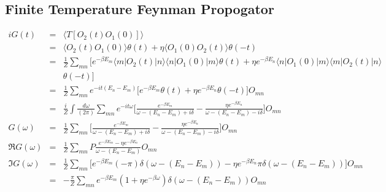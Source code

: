 \documentclass[12pt]{book}
\begin{document}
	\subsection{Finite Temperature Feynman Propogator}
	\begin{eqnarray}
		iG(t)&=&\langle T[O_2(t)O_1(0)]\rangle\\
		&=&\langle O_2(t)O_1(0)\rangle\theta(t)+\eta\langle O_1(0)O_2(t)\rangle\theta(-t)\\
		&=&\frac 1Z\sum_{mn}\big[e^{-\beta E_m}\langle m|O_2(t)|n\rangle\langle n|O_1(0)|m\rangle\theta(t)+\eta e^{-\beta E_n}\langle n|O_1(0)|m\rangle\langle m|O_2(t)|n\rangle\nonumber\\
		&&\theta(-t)\big]\\
		&=&\frac 1Z\sum_{mn}e^{-it(E_n-E_m)}\big[e^{-\beta E_m}\theta(t)+\eta e^{-\beta E_n}\theta(-t)\big]O_{mn}\\
		&=&\frac iZ\int\frac{d\omega}{(2\pi)}\sum_{mn}e^{-it\omega}\big[\frac{e^{-\beta E_m}}{\omega-(E_n-E_m)+i\delta}-\frac{\eta e^{-\beta E_n}}{\omega-(E_n-E_m)-i\delta}\big]O_{mn}\\
		G(\omega)&=&\frac 1Z\sum_{mn}\big[\frac{e^{-\beta E_m}}{\omega-(E_n-E_m)+i\delta}-\frac{\eta e^{-\beta E_n}}{\omega-(E_n-E_m)-i\delta}\big]O_{mn}\\
		\Re G(\omega)&=&\frac 1Z\sum_{mn}P\frac{e^{-\beta E_m}-\eta e^{-\beta E_n}}{\omega-(E_n-E_m)}O_{mn}\\
		\Im G(\omega)&=&\frac 1Z\sum_{mn}\big[e^{-\beta E_m}(-\pi)\delta(\omega-(E_n-E_m))-\eta e^{-\beta E_n}\pi\delta(\omega-(E_n-E_m))\big]O_{mn}\\
		&=&-\frac\pi Z\sum_{mn}e^{-\beta E_m}(1+\eta e^{-\beta\omega})\delta(\omega-(E_n-E_m))O_{mn}
	\end{eqnarray}
\end{document}
